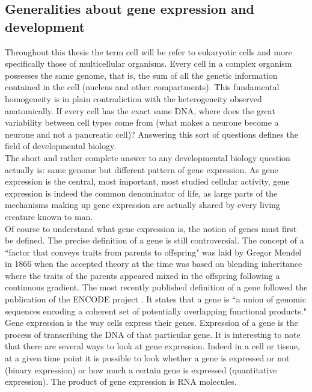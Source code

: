      \subsection{Generalities about gene expression and development}  
     Throughout this thesis the term cell will be refer to eukaryotic cells and more specifically those of multicellular organisms. Every cell in a complex organism possesses the same genome, that is, the sum of all the genetic information contained in the cell (nucleus and other compartments). This fundamental homogeneity is in plain contradiction with the heterogeneity observed anatomically. If every cell has the exact same DNA, where does the great variability between cell types come from (what makes a neurone become a neurone and not a pancreatic cell)? Answering this sort of questions defines the field of developmental biology.\\
     
     The short and rather complete answer to any developmental biology question actually is: same genome but different pattern of gene expression. As gene expression is the central, most important, most studied cellular activity, gene expression is indeed the common denominator of life, as large parts of the mechanisms making up gene expression are actually shared by every living creature known to man.\\

     Of course to understand what gene expression is, the notion of genes must first be defined. The precise definition of a gene is still controversial. The concept of a ``factor that conveys traits from parents to offspring" was laid by Gregor Mendel in 1866 \cite{mendel66} when the accepted theory at the time was based on blending inheritance where the traits of the parents appeared mixed in the offspring following a continuous gradient. The most recently published definition of a gene followed the publication of the ENCODE project \cite{feingold04}. It states that a gene is ``a union of genomic sequences encoding a coherent set of potentially overlapping functional products."\\

	Gene expression is the way cells express their genes. Expression of a gene is the process of transcribing the DNA of that particular gene. It is interesting to note that there are several ways to look at gene expression. Indeed in a cell or tissue, at a given time point it is possible to look whether a gene is expressed or not (binary expression) or how much a certain gene is expressed (quantitative expression). The product of gene expression is RNA molecules.\\
	
